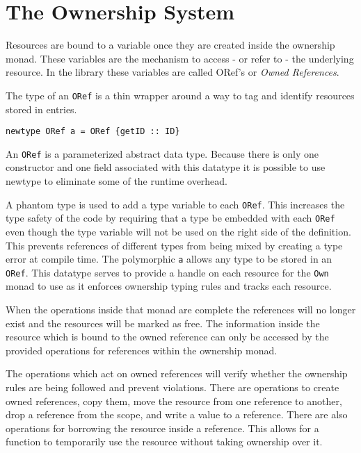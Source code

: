 \documentclass[onehalf,11pt]{beavtex}
\begin{document}
\section{The Ownership System}

Resources are bound to a variable once they are created inside the ownership
monad.  These variables are the mechanism to access - or refer to - the
underlying resource.  In the library these variables are called ORef's
or \textit{Owned References}.

The type of an \texttt{ORef} is a thin wrapper around a way to tag and identify
resources stored in entries.

\begin{verbatim}
newtype ORef a = ORef {getID :: ID}
\end{verbatim}

An \texttt{ORef} is a parameterized abstract data type. Because there is only
one constructor and one field associated with this datatype it is possible to
use newtype to eliminate some of the runtime overhead.

A phantom type is used to add a type variable to each \texttt{ORef}. This
increases the type safety of the code by requiring that a type be embedded
with each \texttt{ORef} even though the type variable will not be used on the
right side of the definition.  This prevents references of different types
from being mixed by creating a type error at compile time.
The polymorphic \texttt{a} allows any type to be stored in an \texttt{ORef}.
This datatype serves to provide a handle on each resource for the \texttt{Own}
monad to use as it enforces ownership typing rules and tracks each resource.

When the operations inside that monad are complete the references
will no longer exist and the resources will be marked as free.
The information inside the resource which is bound to the owned reference can
only be accessed by the provided operations for references within the ownership
monad.

The operations which act on owned references will verify whether the ownership
rules are being followed and prevent violations.  There are operations to create
owned references, copy them, move the resource from one reference to another,
drop a reference from the scope, and write a value to a reference.  There are
also operations for borrowing the resource inside a reference. This allows for a
function to temporarily use the resource without taking ownership over it.
\end{document}
